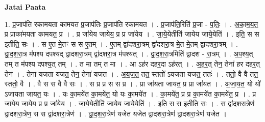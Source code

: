 \documentclass[17pt]{extarticle}
\begin{document}
\textbf{Jatai Paata} \newline

1. प्र॒जाप॑ति रकामयता कामयत प्र॒जाप॑तिः प्र॒जाप॑ति रकामयत । . प्र॒जाप॑ति॒रिति॑ प्र॒जा - प॒तिः॒ । . अ॒का॒म॒य॒त॒ प्र प्राका॑मयता कामयत॒ प्र । . प्र जा॑येय जायेय॒ प्र प्र जा॑येय । . जा॒ये॒येतीति॑ जायेय जाये॒येति॑ । . इति॒ स स इतीति॒ सः । . स ए॒त मे॒तꣳ स स ए॒तम् । . ए॒तम् द्वा॑दशरा॒त्रम् द्वा॑दशरा॒त्र मे॒त मे॒तम् द्वा॑दशरा॒त्रम् । . द्वा॒द॒श॒रा॒त्र म॑पश्य दपश्यद् द्वादशरा॒त्रम् द्वा॑दशरा॒त्र म॑पश्यत् । . द्वा॒द॒श॒रा॒त्रमिति॑ द्वादश - रा॒त्रम् । . अ॒प॒श्य॒त् तम् त म॑पश्य दपश्य॒त् तम् । . त मा तम् त मा । . आ ऽह॑र दहर॒दा ऽह॑रत् । . अ॒ह॒र॒त् तेन॒ तेना॑ हर दहर॒त् तेन॑ । . तेना॑ यजता यजत॒ तेन॒ तेना॑ यजत । . अ॒य॒ज॒त॒ तत॒ स्ततो॑ ऽयजता यजत॒ ततः॑ । . ततो॒ वै वै तत॒ स्ततो॒ वै । . वै स स वै वै सः । . स प्र प्र स स प्र । . प्रा जा॑यता जायत॒ प्र प्रा जा॑यत । . अ॒जा॒य॒त॒ यो यो॑ ऽजायता जायत॒ यः । . यः का॒मये॑त का॒मये॑त॒ यो यः का॒मये॑त । . का॒मये॑त॒ प्र प्र का॒मये॑त का॒मये॑त॒ प्र । . प्र जा॑येय जायेय॒ प्र प्र जा॑येय । . जा॒ये॒येतीति॑ जायेय जाये॒येति॑ । . इति॒ स स इतीति॒ सः । . स द्वा॑दशरा॒त्रेण॑ द्वादशरा॒त्रेण॒ स स द्वा॑दशरा॒त्रेण॑ । . द्वा॒द॒श॒रा॒त्रेण॑ यजेत यजेत द्वादशरा॒त्रेण॑ द्वादशरा॒त्रेण॑ यजेत । \newline
\end{document}
